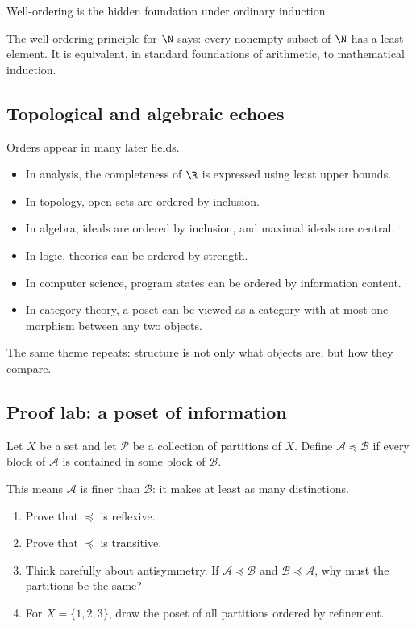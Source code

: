 Well-ordering is the hidden foundation under ordinary induction.

\begin{formalbox}
The well-ordering principle for $\N$ says: every nonempty subset of $\N$ has a least element. It is equivalent, in standard foundations of arithmetic, to mathematical induction.
\end{formalbox}

\subsection{Topological and algebraic echoes}

Orders appear in many later fields.

\begin{itemize}
\item In analysis, the completeness of $\R$ is expressed using least upper bounds.
\item In topology, open sets are ordered by inclusion.
\item In algebra, ideals are ordered by inclusion, and maximal ideals are central.
\item In logic, theories can be ordered by strength.
\item In computer science, program states can be ordered by information content.
\item In category theory, a poset can be viewed as a category with at most one morphism between any two objects.
\end{itemize}

The same theme repeats: structure is not only what objects are, but how they compare.

\subsection{Proof lab: a poset of information}

\begin{labbox}
Let $X$ be a set and let $\mathcal{P}$ be a collection of partitions of $X$. Define $\mathcal{A}\preceq\mathcal{B}$ if every block of $\mathcal{A}$ is contained in some block of $\mathcal{B}$.

This means $\mathcal{A}$ is finer than $\mathcal{B}$: it makes at least as many distinctions.

\begin{enumerate}
\item Prove that $\preceq$ is reflexive.
\item Prove that $\preceq$ is transitive.
\item Think carefully about antisymmetry. If $\mathcal{A}\preceq\mathcal{B}$ and $\mathcal{B}\preceq\mathcal{A}$, why must the partitions be the same?
\item For $X=\{1,2,3\}$, draw the poset of all partitions ordered by refinement.
\end{enumerate}
\end{labbox}

